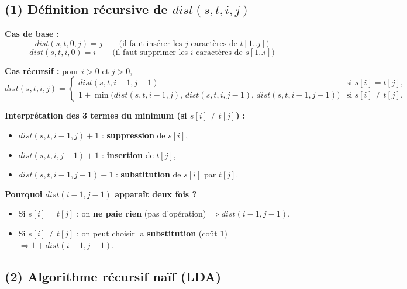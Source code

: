 \documentclass[12pt,a4paper]{article}
\begin{document}
\subsection{(1) Définition récursive de $dist(s,t,i,j)$}

\begin{algorithme}
\textbf{Cas de base :}
\[
dist(s,t,0,j)=j \qquad\text{(il faut insérer les $j$ caractères de $t[1..j]$)}
\]
\[
dist(s,t,i,0)=i \qquad\text{(il faut supprimer les $i$ caractères de $s[1..i]$)}
\]

\medskip
\textbf{Cas récursif :} pour $i>0$ et $j>0$,
\[
dist(s,t,i,j)=
\begin{cases}
dist(s,t,i-1,j-1) & \text{si } s[i]=t[j],\\[0.4em]
1+\min\big(dist(s,t,i-1,j),\,dist(s,t,i,j-1),\,dist(s,t,i-1,j-1)\big) & \text{si } s[i]\neq t[j].
\end{cases}
\]

\medskip
\textbf{Interprétation des 3 termes du minimum (si $s[i]\neq t[j]$) :}
\begin{itemize}
    \item $dist(s,t,i-1,j)+1$ : \textbf{suppression} de $s[i]$,
    \item $dist(s,t,i,j-1)+1$ : \textbf{insertion} de $t[j]$,
    \item $dist(s,t,i-1,j-1)+1$ : \textbf{substitution} de $s[i]$ par $t[j]$.
\end{itemize}
\end{algorithme}

\begin{notecours}
\textbf{Pourquoi $dist(i-1,j-1)$ apparaît deux fois ?}
\begin{itemize}
    \item Si $s[i]=t[j]$ : on \textbf{ne paie rien} (pas d'opération) $\Rightarrow dist(i-1,j-1)$.
    \item Si $s[i]\neq t[j]$ : on peut choisir la \textbf{substitution} (coût 1) $\Rightarrow 1+dist(i-1,j-1)$.
\end{itemize}
\end{notecours}

\subsection{(2) Algorithme récursif naïf (LDA)}
\end{document}
